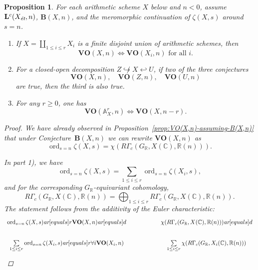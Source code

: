 \documentclass[10pt,a4paper,oneside]{article}
\DeclareMathOperator{\ord}{ord}
\newcommand{\CC}{\mathbb{C}}
\newcommand{\RR}{\mathbb{R}}
\renewcommand{\AA}{\mathbb{A}}
\newcommand{\ar}{\text{\it ar}}
\newcommand{\et}{\text{\it \'{e}t}}
\theoremstyle{myplain}
\newtheorem{proposition}[theorem]{Proposition}
\theoremstyle{mydefinition}
\numberwithin{equation}{section}
\begin{document}
\begin{proposition}
  \label{prop:compatibility-of-VO(X,n)}
  For each arithmetic scheme $X$ below and $n < 0$, assume
  $\mathbf{L}^c (X_\et,n)$, $\mathbf{B} (X,n)$, and the meromorphic continuation
  of $\zeta (X,s)$ around $s = n$.

  \begin{enumerate}
  \item[1)] If $X = \coprod_{1 \le i \le r} X_i$ is a finite disjoint union of
    arithmetic schemes, then
    $$\mathbf{VO} (X,n) \iff \mathbf{VO} (X_i,n)\text{ for all }i.$$

  \item[2)] For a closed-open decomposition
    $Z \not\hookrightarrow X \hookleftarrow U$,
    if two of the three conjectures
    \[ \mathbf{VO} (X,n), \quad
      \mathbf{VO} (Z,n), \quad
      \mathbf{VO} (U,n) \]
    are true, then the third is also true.

  \item[3)] For any $r \ge 0$, one has
    $$\mathbf{VO} (\AA^r_X, n) \iff \mathbf{VO} (X, n-r).$$
  \end{enumerate}

  \begin{proof}
    We have already observed in Proposition~\ref{prop:VO(X,n)-assuming-B(X,n)}
    that under Conjecture~$\mathbf{B} (X,n)$ we can rewrite $\mathbf{VO} (X,n)$
    as
    $$\ord_{s=n} \zeta (X,s) = \chi (R\Gamma_c (G_\RR, X(\CC), \RR (n))).$$

    In part 1), we have
    $$\ord_{s=n} \zeta (X,s) = \sum_{1 \le i \le r} \ord_{s=n} \zeta (X_i,s),$$
    and for the corresponding $G_\RR$-equivariant cohomology,
    \[ R\Gamma_c (G_\RR, X(\CC), \RR (n)) =
      \bigoplus_{1 \le i \le r} R\Gamma_c (G_\RR, X(\CC), \RR (n)). \]
    The statement follows from the additivity of the Euler characteristic:
    \[ \begin{tikzcd}[column sep=5em]
        \ord_{s=n} \zeta (X,s) \ar[equals]{r}{\mathbf{VO} (X,n)}\ar[equals]{d} & \chi (R\Gamma_c (G_\RR, X(\CC), \RR (n))) \ar[equals]{d} \\
        \sum\limits_{1 \le i \le r} \ord_{s=n} \zeta (X_i,s) \ar[equals]{r}{\forall i \mathbf{VO} (X_i,n)} & \sum\limits_{1 \le i \le r} \chi (R\Gamma_c (G_\RR, X_i (\CC), \RR (n)))
      \end{tikzcd} \]


\end{proof}
\end{proposition}
\end{document}
